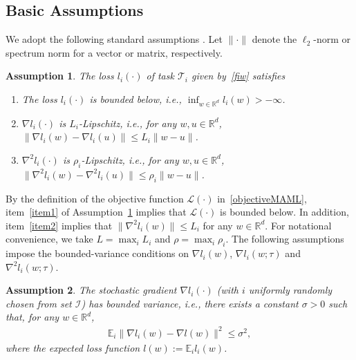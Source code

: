 \documentclass{osudissert96}
\newtheorem{assum}{Assumption}
\begin{document}
\subsection*{Basic Assumptions}
We adopt the following standard assumptions %
\cite{fallah2020convergence,rajeswaran2019meta}. Let $\|\cdot\|$ denote the $\ell_2$-norm or spectrum norm for a vector or matrix, respectively. 
\begin{assum}\label{assum:smooth}
	The loss $l_i(\cdot)$ of task $\mathcal{T}_i$ given by~\cref{fiw} satisfies
	\begin{enumerate}
		\item The loss $l_i(\cdot)$  is bounded below, i.e., { $ \inf_{w\in\mathbb{R}^d} l_i(w) > -\infty$}.  \label{item1}		

		\item $\nabla l_i(\cdot)$ is $L_i$-Lipschitz, i.e., for any $w,u\in\mathbb{R}^d$,     \label{item2}
$		\|\nabla l_i(w)-\nabla l_i(u)\| \leq L_i\|w-u\|$.
		\item  $\nabla^2 l_i(\cdot)$ is  $\rho_i$-Lipschitz, i.e., for any $w,u\in\mathbb{R}^d$,
$		\|\nabla^2 l_i(w)-\nabla^2 l_i(u)\| \leq \rho_i\|w-u\|$.
	\end{enumerate}
\end{assum}

By the definition of the objective function $\mathcal{L}(\cdot)$ in~\cref{objectiveMAML},  item~\ref{item1} of  Assumption~\ref{assum:smooth} implies that $\mathcal{L}(\cdot)$ is bounded below. In addition, 
item~\ref{item2}  implies that {\small$\|\nabla^2 l_i(w)\|\leq L_i$} for any $w\in\mathbb{R}^d$. 
For notational convenience,   we take $L=\max_i L_i$ and $\rho = \max_{i} \rho_i$. 
The following assumptions impose the  bounded-variance conditions on $\nabla l_i(w)$, $\nabla l_i(w; \tau)$ and $\nabla^2 l_i(w; \tau)$.%
\begin{assum}\label{a2}
	The stochastic gradient $\nabla l_i(\cdot)$ (with $i$ uniformly randomly chosen from set $\mathcal{I}$) has bounded variance, i.e., there exists a constant $\sigma>0$ such that, for any $w\in\mathbb{R}^d$,
	\begin{align*}
	\mathbb{E}_{i}\|\nabla l_i(w) - \nabla l(w)\|^2 \leq \sigma^2, 
	\end{align*}
	where the expected loss function $l(w):=\mathbb{E}_{i}l_i(w)$.
\end{assum}
\end{document}
